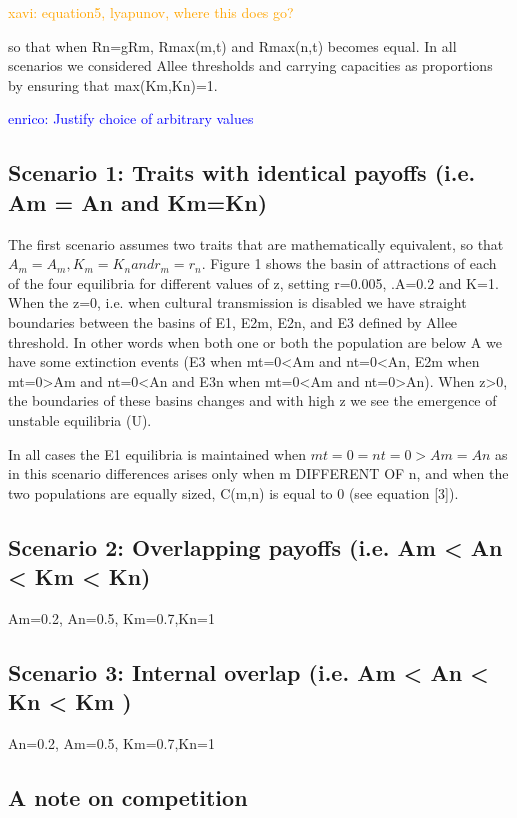 \documentclass[preprint,authoryear]{elsarticle}
\newcommand{\memo}[2]{\textcolor{#1}{#2}}
\newcommand{\xavi}[1]{\memo{orange}{xavi: #1\\}}
\newcommand{\enrico}[1]{\memo{blue}{enrico: #1\\}}
\begin{document}
\xavi{equation5, lyapunov, where this does go?}

so that when Rn=gRm,  Rmax(m,t) and Rmax(n,t) becomes equal. In all scenarios we considered Allee thresholds and carrying capacities as proportions by ensuring that max(Km,Kn)=1.

\enrico{Justify choice of arbitrary values}

\subsection{Scenario 1: Traits with identical payoffs (i.e. Am = An   and Km=Kn)}

The first scenario assumes two traits that are mathematically equivalent, so that $A_m = A_m, K_m=K_n and r_m=r_n$. Figure 1 shows the basin of attractions of each of the four equilibria for different values of z, setting r=0.005, .A=0.2 and K=1. When the z=0, i.e. when cultural transmission is disabled we have straight boundaries between the basins of E1, E2m, E2n, and E3 defined by Allee threshold. In other words when both one or both the population are below A we have some extinction events (E3 when mt=0<Am and nt=0<An, E2m when mt=0>Am and nt=0<An and E3n when mt=0<Am and nt=0>An). When z>0, the boundaries of these basins changes and with high z we see the emergence of unstable equilibria (U). 


In all cases the E1 equilibria is maintained when $mt=0=nt=0 > Am=An$ as in this scenario differences arises only when m DIFFERENT OF n, and when the two populations are equally sized, C(m,n) is equal to 0 (see equation [3]).  

\subsection{Scenario 2: Overlapping payoffs (i.e.  Am <  An  < Km < Kn)}

Am=0.2, An=0.5, Km=0.7,Kn=1

\subsection{Scenario 3: Internal overlap  (i.e.  Am <  An < Kn <  Km )}

An=0.2, Am=0.5, Km=0.7,Kn=1

\subsection{A note on competition}
\end{document}
